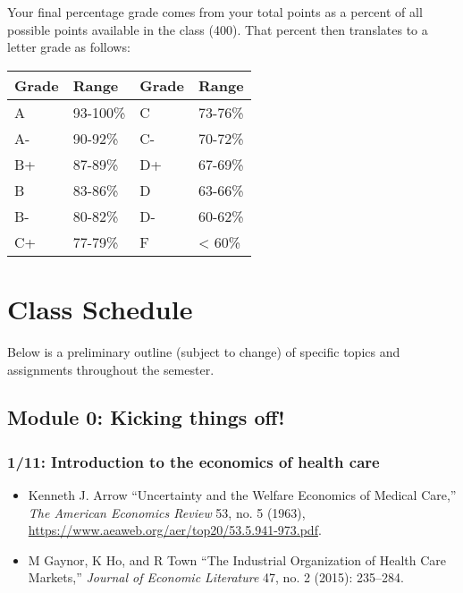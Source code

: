 \documentclass[11pt,]{article}
\providecommand{\tightlist}{%
  \setlength{\itemsep}{0pt}\setlength{\parskip}{0pt}}
\begin{document}
Your final percentage grade comes from your total points as a percent of
all possible points available in the class (400). That percent then
translates to a letter grade as follows:

\begin{longtable}[]{@{}llll@{}}
\toprule()
Grade & Range & Grade & Range \\
\midrule()
\endhead
A & 93-100\% & C & 73-76\% \\
A- & 90-92\% & C- & 70-72\% \\
B+ & 87-89\% & D+ & 67-69\% \\
B & 83-86\% & D & 63-66\% \\
B- & 80-82\% & D- & 60-62\% \\
C+ & 77-79\% & F & \textless{} 60\% \\
\bottomrule()
\end{longtable}

\hypertarget{class-schedule}{%
\section{Class Schedule}\label{class-schedule}}

Below is a preliminary outline (subject to change) of specific topics
and assignments throughout the semester.

\hypertarget{module-0-kicking-things-off}{%
\subsection{Module 0: Kicking things
off!}\label{module-0-kicking-things-off}}

\hypertarget{introduction-to-the-economics-of-health-care}{%
\subsubsection{1/11: Introduction to the economics of health
care}\label{introduction-to-the-economics-of-health-care}}

\begin{itemize}
\tightlist
\item
  Kenneth J. Arrow {``Uncertainty and the {Welfare} {Economics} of
  {Medical} {Care},''} \emph{The American Economics Review} 53, no. 5
  (1963), \url{https://www.aeaweb.org/aer/top20/53.5.941-973.pdf}.
\item
  M Gaynor, K Ho, and R Town {``The {Industrial} {Organization} of
  {Health} {Care} {Markets},''} \emph{Journal of Economic Literature}
  47, no. 2 (2015): 235--284.
\end{itemize}
\end{document}
